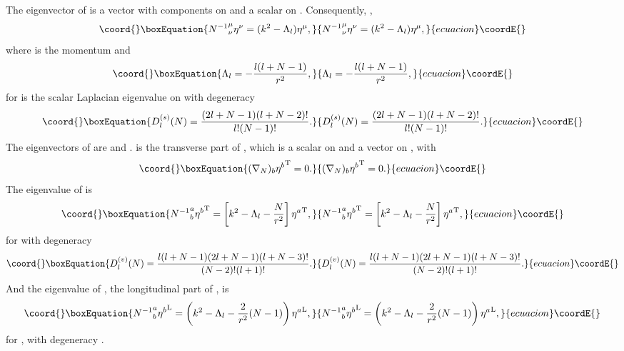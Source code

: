 \documentclass[a4paper,aps,preprint,groupedaddress,showpacs]{revtex4}
\begin{document}
The eigenvector \myHighlight{$\eta^{\nu}$}\coordHE{} of \coordHE{} is a 
vector with \coordHE{} components on \coordHE{} and a scalar on \coordHE{}. 
Consequently, \cite{RO}, 
\begin{equation}\coord{}\boxEquation{
{N^{-1}}^{\mu}_{\nu}\eta^{\nu}=(k^{2}-\Lambda_{l})\eta^{\mu},
\label{N1}
}{
{N^{-1}}^{\mu}_{\nu}\eta^{\nu}=(k^{2}-\Lambda_{l})\eta^{\mu},
}{ecuacion}\coordE{}\end{equation}
where \coordHE{} is the momentum and 
\begin{equation}\coord{}\boxEquation{
\Lambda_{l}=-\frac{l(l+N-1)}{r^{2}},
}{
\Lambda_{l}=-\frac{l(l+N-1)}{r^{2}},
}{ecuacion}\coordE{}\end{equation}
for \coordHE{} is the scalar Laplacian eigenvalue on \coordHE{}
with degeneracy
\begin{equation}\coord{}\boxEquation{
D^{(s)}_{l}(N)=\frac{(2l+N-1)(l+N-2)!}{l!(N-1)!}.
}{
D^{(s)}_{l}(N)=\frac{(2l+N-1)(l+N-2)!}{l!(N-1)!}.
}{ecuacion}\coordE{}\end{equation}
The eigenvectors of \coordHE{} are \coordHE{} and
\coordHE{}. \coordHE{} is the transverse part of 
\coordHE{}, which is a scalar on \coordHE{} and a vector on \coordHE{},
with
\begin{equation}\coord{}\boxEquation{
(\nabla_{N})_{b}{\eta^{b}}^{\rm T}=0.
}{
(\nabla_{N})_{b}{\eta^{b}}^{\rm T}=0.
}{ecuacion}\coordE{}\end{equation}
The eigenvalue of \coordHE{} is 
\begin{equation}\coord{}\boxEquation{
{N^{-1}}^{a}_{b}{\eta^{b}}^{\rm T}=
\left[k^{2}-\Lambda_{l}-\frac{N}{r^{2}}\right]{\eta^{a}}^{\rm T},
\label{N2}
}{
{N^{-1}}^{a}_{b}{\eta^{b}}^{\rm T}=
\left[k^{2}-\Lambda_{l}-\frac{N}{r^{2}}\right]{\eta^{a}}^{\rm T},
}{ecuacion}\coordE{}\end{equation}
for \coordHE{} with degeneracy
\begin{equation}\coord{}\boxEquation{
D^{(v)}_{l}(N)=\frac{l(l+N-1)(2l+N-1)(l+N-3)!}{(N-2)!(l+1)!}.
}{
D^{(v)}_{l}(N)=\frac{l(l+N-1)(2l+N-1)(l+N-3)!}{(N-2)!(l+1)!}.
}{ecuacion}\coordE{}\end{equation}
And the eigenvalue of \coordHE{}, the longitudinal part
of \coordHE{}, is
\begin{equation}\coord{}\boxEquation{
{N^{-1}}^{a}_{b}{\eta^{b}}^{\rm L}=
\left(k^{2}-\Lambda_{l}-\frac{2}{r^2}(N-1)\right)
{\eta^{a}}^{\rm L},
\label{N3}
}{
{N^{-1}}^{a}_{b}{\eta^{b}}^{\rm L}=
\left(k^{2}-\Lambda_{l}-\frac{2}{r^2}(N-1)\right)
{\eta^{a}}^{\rm L},
}{ecuacion}\coordE{}\end{equation}
for \coordHE{}, with degeneracy \coordHE{}.
\end{document}
